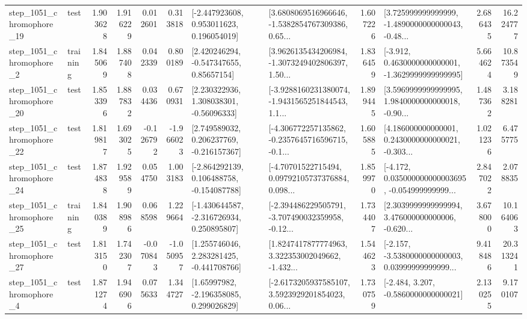 \begin{tabular}{llrrrrllrlrr}
 step\_1051\_chromophore\_19 &      test &      1.903628 &    1.916229 &      0.012601 &  0.313818 &    [-2.447923608, 0.953011623, 0.196054019] &  [3.6808069516966646, -1.5382854767309386, 0.65... &       1.607226 &  [3.725999999999999, -1.4890000000000043, -0.48... &            2.686435 &         16.224777 \\
  step\_1051\_chromophore\_2 &  training &      1.845069 &    1.887408 &      0.042339 &  0.800189 &     [2.420246294, -0.547347655, 0.85657154] &  [3.9626135434206984, -1.3073249402806397, 1.50... &       1.836459 &  [-3.912, 0.4630000000000001, -1.3629999999999995] &            5.664624 &         10.873549 \\
 step\_1051\_chromophore\_20 &      test &      1.853396 &    1.887832 &      0.034436 &  0.670931 &     [2.230322936, 1.308038301, -0.56096333] &  [-3.9288160231380074, -1.9431565251844543, 1.1... &       1.899445 &  [3.5969999999999995, 1.9840000000000018, -0.90... &            1.487362 &          3.188281 \\
 step\_1051\_chromophore\_22 &      test &      1.819817 &    1.693025 &     -0.126792 & -1.966023 &    [2.749589032, 0.206237769, -0.216157367] &  [-4.306772257135862, -0.2357645716596715, -0.1... &       1.605885 &  [4.186000000000001, 0.2430000000000021, -0.303... &            1.021236 &          6.475775 \\
 step\_1051\_chromophore\_24 &      test &      1.874838 &    1.929589 &      0.054750 &  1.003183 &   [-2.864292139, 0.106488758, -0.154087788] &  [-4.70701522715494, 0.09792105737376884, 0.098... &       1.859970 &  [-4.172, 0.035000000000003695, -0.054999999999... &            2.847022 &          2.078835 \\
 step\_1051\_chromophore\_25 &  training &      1.840389 &    1.908986 &      0.068598 &  1.229664 &   [-1.430644587, -2.316726934, 0.250895807] &  [-2.394486229505791, -3.707490032359958, -0.12... &       1.734407 &  [2.3039999999999994, 3.476000000000006, -0.620... &            3.678000 &         10.164063 \\
 step\_1051\_chromophore\_27 &      test &      1.813150 &    1.742307 &     -0.070843 & -1.050957 &    [1.255746046, 2.283281425, -0.441708766] &  [1.8247417877774963, 3.322353002049662, -1.432... &       1.544623 &  [-2.157, -3.5380000000000003, 0.03999999999999... &            9.418486 &         20.313241 \\
  step\_1051\_chromophore\_4 &      test &      1.871274 &    1.946906 &      0.075633 &  1.344727 &     [1.65997982, -2.196358085, 0.299026829] &  [-2.6173205937585107, 3.5923929201854023, 0.06... &       1.730759 &               [-2.484, 3.207, -0.5860000000000021] &            2.130255 &          9.170107 \\

\end{tabular}
